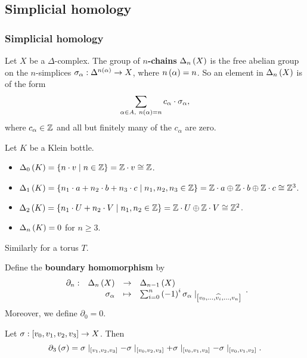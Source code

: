 \pagebreak

\subsection{Simplicial homology}

\subsubsection{Simplicial homology}

Let $ X $ be a $ \Delta $-complex. The group of \textbf{$ n $-chains} $ \Delta_n\rb{X} $ is the free abelian group on the $ n $-simplices $ \sigma_\alpha : \Delta^{n\rb{\alpha}} \to X $, where $ n\rb{\alpha} = n $. So an element in $ \Delta_n\rb{X} $ is of the form
$$ \sum_{\alpha \in A, \ n\rb{\alpha} = n} c_\alpha \cdot \sigma_\alpha, $$
where $ c_\alpha \in \Z $ and all but finitely many of the $ c_\alpha $ are zero.

\begin{example*}
Let $ K $ be a Klein bottle.
\begin{itemize}
\item $ \Delta_0\rb{K} = \cb{n \cdot v \mid n \in \Z} = \Z \cdot v \cong \Z $.
\item $ \Delta_1\rb{K} = \cb{n_1 \cdot a + n_2 \cdot b + n_3 \cdot c \mid n_1, n_2, n_3 \in \Z} = \Z \cdot a \oplus \Z \cdot b \oplus \Z \cdot c \cong \Z^3 $.
\item $ \Delta_2\rb{K} = \cb{n_1 \cdot U + n_2 \cdot V \mid n_1, n_2 \in \Z} = \Z \cdot U \oplus \Z \cdot V \cong \Z^2 $.
\item $ \Delta_n\rb{K} = 0 $ for $ n \ge 3 $.
\end{itemize}
Similarly for a torus $ T $.
\end{example*}


Define the \textbf{boundary homomorphism} by
$$ \function[\partial_n]{\Delta_n\rb{X}}{\Delta_{n - 1}\rb{X}}{\sigma_\alpha}{\sum_{i = 0}^n \rb{-1}^i\sigma_\alpha \mid_{\sb{v_0, \dots, \widehat{v_i}, \dots, v_n}}}. $$
Moreover, we define $ \partial_0 = 0 $.

\begin{example*}
Let $ \sigma : \sb{v_0, v_1, v_2, v_3} \to X $. Then
$$ \partial_3\rb{\sigma} = \sigma \mid_{\sb{v_1, v_2, v_3}} - \sigma \mid_{\sb{v_0, v_2, v_3}} + \sigma \mid_{\sb{v_0, v_1, v_3}} - \sigma \mid_{\sb{v_0, v_1, v_2}}. $$
\end{example*}

